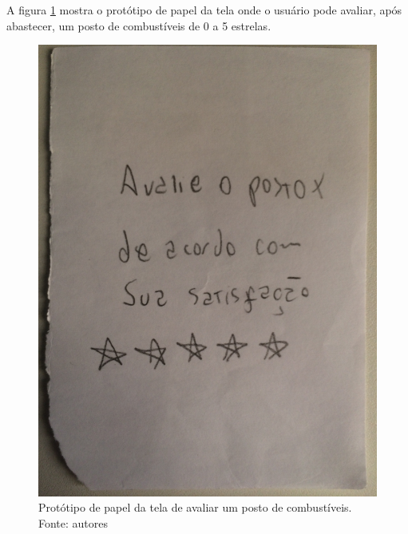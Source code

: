 A figura \ref{img:prototipo_de_papel_avaliar_posto} mostra o protótipo de papel da tela onde o usuário pode avaliar, após abastecer, um posto de combustíveis de 0 a 5 estrelas.
\begin{figure}[H]
    \centering
    \includegraphics[scale=0.1, angle=-90]{figuras/prototipo_papel_avaliar_posto.jpg}
    \caption[Protótipo de papel da tela de avaliar um posto de combustíveis]{Protótipo de papel da tela de avaliar um posto de combustíveis. Fonte: autores}
    \label{img:prototipo_de_papel_avaliar_posto}
\end{figure}
 \pagebreak

